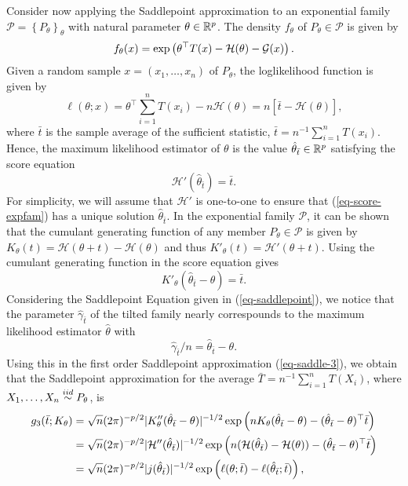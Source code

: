 Consider now applying the Saddlepoint approximation to an exponential family $\mathcal{P} = \left\{P_\theta\right\}_{\theta}$ with natural parameter $\theta \in {\mathbb{R}^p}$. The density $f_\theta$ of $P_\theta \in \mathcal{P}$ is given by
\begin{equation*}
    f_\theta(x) = \exp\left(\theta^\top T(x) - \mathcal{H}(\theta) - \mathcal{G}(x)\right).
\end{equation*}
Given a random sample $x = (x_1, \ldots, x_n)$ of $P_\theta$, the loglikelihood function is given by
\begin{equation*}
    \ell(\theta; x) = \theta^\top \sum_{i=1}^n T(x_i) - n \mathcal{H}(\theta) = n\left[\bar t - \mathcal{H}(\theta)\right],
\end{equation*}
where $\bar t$ is the sample average of the sufficient statistic, $\bar t = n^{-1}\sum_{i=1}^n T(x_i)$. Hence, the maximum likelihood estimator of $\theta$ is the value $\hat\theta_{\bar t} \in {\mathbb{R}^p}$ satisfying the score equation
\begin{equation} \label{eq-score-expfam}
    \mathcal{H}'(\hat\theta_{\bar t}) = \bar t.
\end{equation}
For simplicity, we will assume that $\mathcal{H}'$ is one-to-one to ensure that (\ref{eq-score-expfam}) has a unique solution $\hat\theta_{\bar t}$. In the exponential family $\mathcal{P}$, it can be shown that the cumulant generating function of any member $P_\theta \in \mathcal{P}$ is given by $K_\theta(t) = \mathcal{H}(\theta + t) - \mathcal{H}(\theta)$ and thus $K'_\theta(t) = \mathcal{H}'(\theta + t)$. Using the cumulant generating function in the score equation gives
\begin{equation*}
    K'_\theta(\hat\theta_{\bar t} - \theta) = \bar t.
\end{equation*}
Considering the Saddlepoint Equation given in (\ref{eq-saddlepoint}), we notice that the  parameter $\hat\gamma_{\bar t}$ of the tilted family nearly correspounds to the maximum likelihood estimator $\hat\theta$ with
\begin{equation*}
    \hat\gamma_{\bar t}/n = \hat\theta_{\bar t} - \theta.
\end{equation*}
Using this in the first order Saddlepoint approximation (\ref{eq-saddle-3}), we obtain that the Saddlepoint approximation for the average $\bar T = n^{-1}\sum_{i=1}^n T(X_i)$,  where $X_1, \ldots, X_n \stackrel{iid}{\sim} P_\theta$, is
\begin{align*}
    g_3(\bar t; K_\theta) 
    &= \sqrt{n} (2\pi)^{-p/2}|K_\theta''(\hat\theta_{\bar t} - \theta)|^{-1/2} \exp\left(nK_\theta(\hat\theta_{\bar t} - \theta) - (\hat\theta_{\bar t} - \theta)^\top \bar t\right)\\
    &= \sqrt{n} (2\pi)^{-p/2}|\mathcal{H}''(\hat\theta_{\bar t})|^{-1/2} \exp\left(n(\mathcal{H}(\hat\theta_{\bar t}) - \mathcal{H}(\theta)) - (\hat\theta_{\bar t} - \theta)^\top \bar t\right)\\
    &= \sqrt{n} (2\pi)^{-p/2}|j(\hat\theta_{\bar t})|^{-1/2} \exp\left(\ell(\theta; \bar t) - \ell(\hat\theta_{\bar t}; \bar t)\right),
\end{align*}
